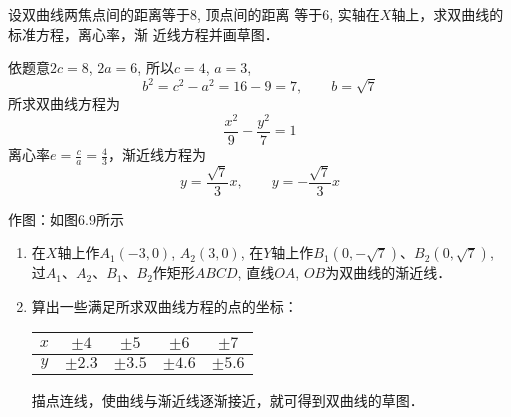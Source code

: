 \begin{example}
    设双曲线两焦点间的距离等于8, 顶点间的距离
等于6, 实轴在$X$轴上，求双曲线的标准方程，离心率，渐
近线方程并画草图．
\end{example}

\begin{solution}
    依题意$2c=8$, $2a=6$, 所以$c=4$, $a=3$,
\[    b^2=c^2-a^2=16-9=7,\qquad  b=\sqrt{7}\]
    所求双曲线方程为
\[\frac{x^2}{9}-\frac{y^2}{7}=1\]
离心率$e=\frac{c}{a}=\frac{4}{3}$，渐近线方程为
\[y=\frac{\sqrt{7}}{3}x,\qquad y=-\frac{\sqrt{7}}{3}x\]

作图：如图6.9所示
\begin{enumerate}
\item 在$X$轴上作$A_1(-3,
0)$, $A_2(3,0)$, 在$Y$轴上作$B_1(0,-\sqrt{7})$、$B_2(0,
\sqrt{7})$, 过$A_1$、$A_2$、$B_1$、$B_2$作矩形$ABCD$, 直线$OA$, 
$OB$为双曲线的渐近线．
\item 算出一些满足所求双曲线方程的点的坐标：
\begin{center}
\begin{tabular}{ccccc}
\hline
$x$ & $\pm 4$ & $\pm 5$ & $\pm 6$ & $\pm 7$\\
\hline
$y$ &  $\pm 2.3$ & $\pm 3.5$ & $\pm 4.6$ & $\pm 5.6$\\
\hline
\end{tabular}
\end{center}
描点连线，使曲线与渐近线逐渐接近，就可得到双曲线的草图．
\end{enumerate}
\end{solution}


